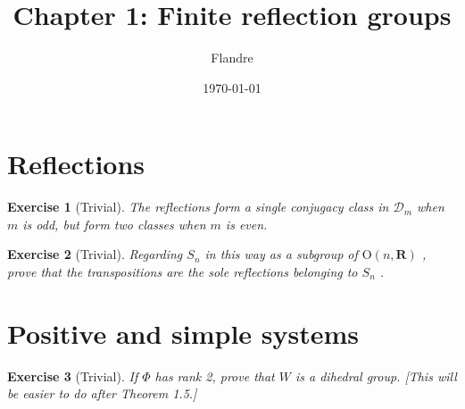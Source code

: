 \documentclass{article}
\title{Chapter 1: Finite reflection groups}
\author{Flandre}
\date{\today}
\theoremstyle{breakstyle}
\newtheorem{exercise}{Exercise}[section]
\begin{document}
\maketitle

\section{Reflections}

\begin{exercise}[Trivial]
The reflections form a single conjugacy class in $\mathcal{D}_m$ when $m$ is
odd, but form two classes when $m$ is even.
\end{exercise}

\begin{exercise}[Trivial]
Regarding $S_{n}$ in this way as a subgroup of $\mathrm{O}(n, \mathbf{R})$ ,
prove that the transpositions are the sole reflections belonging to $S_{n}$ .
\end{exercise}

\setcounter{section}{2}
\section{Positive and simple systems}

\begin{exercise}[Trivial]
If $\Phi$ has rank 2, prove that $W$ is a dihedral group. [This will be easier
to do after Theorem 1.5.]
\end{exercise}
\end{document}
